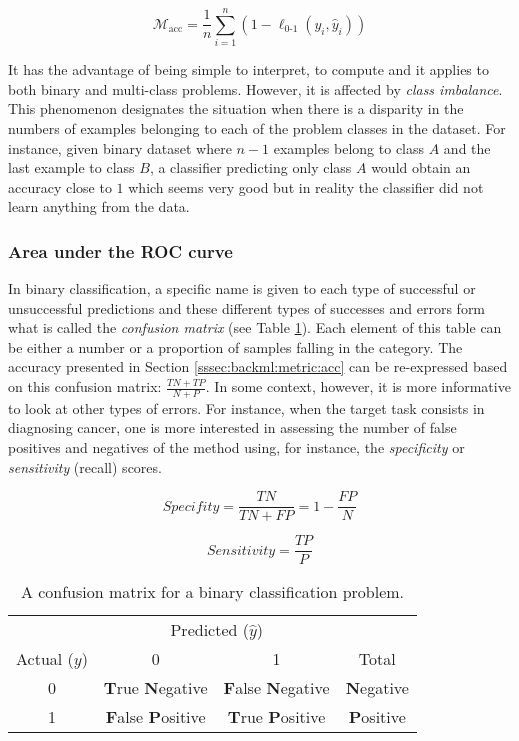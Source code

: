\begin{equation}
\label{eqn:backml:accuracy}
\mathcal{M}_{\text{acc}} = \dfrac{1}{n} \sum\limits_{i = 1}^n (1 - \ell_{\text{0-1}}(y_i, \hat{y}_i))
\end{equation}

It has the advantage of being simple to interpret, to compute and it applies to
both binary and multi-class problems. However, it is affected by \textit{class imbalance}.
This phenomenon designates the situation when there is a disparity in the numbers
of examples belonging to each of the problem classes in the dataset. For instance,
given binary dataset where $n-1$ examples belong to class $A$ and the last example
to class $B$, a classifier predicting only class $A$ would obtain an accuracy
close to $1$ which seems very good but in reality the classifier did not learn
anything from the data.

\subsubsection{Area under the ROC curve}
\label{sssec:backml:metric:rocauc}

In binary classification, a specific name is given to each type of successful or
unsuccessful predictions and these different types of successes and errors form
what is called the \textit{confusion matrix} (see Table \ref{tab:backml:confusion}).
Each element of this table can be either a number or a proportion of samples
falling in the category. The accuracy presented in Section \ref{sssec:backml:metric:acc}
can be re-expressed based on this confusion matrix: $\frac{TN + TP}{N + P}$. In
some context, however, it is more informative to look at other types of errors.
For instance, when the target task consists in diagnosing cancer, one is more
interested in assessing the number of false positives and negatives of the method
using, for instance, the \textit{specificity} or \textit{sensitivity} (\aka recall)
scores.

\begin{equation}
\label{eqn:backml:specifity}
\textit{Specifity} = \frac{TN}{TN + FP} = 1 - \frac{FP}{N}
\end{equation}

\begin{equation}
\label{eqn:backml:sensitivity}
\textit{Sensitivity} = \frac{TP}{P}
\end{equation}

\begin{table}
  \centering
  \begin{tabular}{c|cc|c}
  & \multicolumn{2}{c}{Predicted ($\hat{y}$)} & \\
  Actual ($y$) & 0 & 1 & Total \\
  \hline
  0 & \textbf{T}rue \textbf{N}egative & \textbf{F}alse \textbf{N}egative & \textbf{N}egative \\
  1 & \textbf{F}alse \textbf{P}ositive & \textbf{T}rue \textbf{P}ositive & \textbf{P}ositive \\
  \end{tabular}
  \caption{A confusion matrix for a binary classification problem.}
  \label{tab:backml:confusion}
\end{table}

